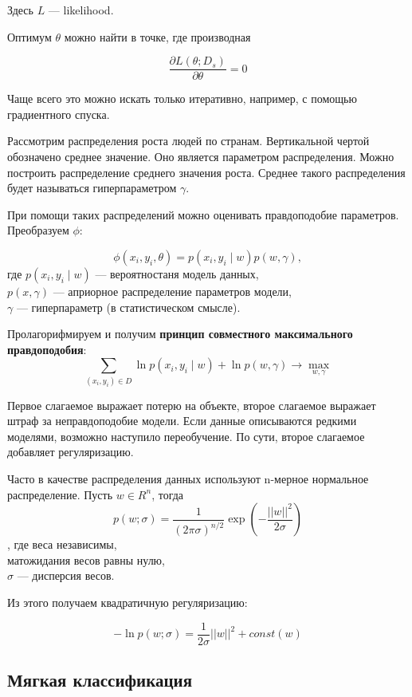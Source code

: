 Здесь $L$ --- likelihood.

Оптимум $\theta$ можно найти в точке, где производная

\[
    \frac{\partial L(\theta; D_s)}{\partial \theta} = 0
\]

Чаще всего это можно искать только итеративно, например, с помощью градиентного
спуска.

Рассмотрим распределения роста людей по странам. Вертикальной чертой
обозначено среднее значение. Оно является параметром распределения. Можно
построить распределение среднего значения роста. Среднее такого распределения
будет называться гиперпараметром $\gamma$.


При помощи таких распределений можно оценивать правдоподобие параметров.
Преобразуем $\phi$:

\[
    \phi(x_i, y_i, \theta) = p(x_i, y_i \mid w) p(w, \gamma),
\] где $p(x_i, y_i \mid w)$ --- вероятностаня модель данных,\\
$p(x, \gamma)$ --- априорное распределение параметров модели,\\
$\gamma$ --- гиперпараметр (в статистическом смысле).

Пролагорифмируем и получим \textbf{принцип совместного максимального правдоподобия}:
\[
    \sum_{(x_i, y_i) \in D} \ln p(x_i, y_i \mid w) + \ln p(w, \gamma) \to
    \max_{w, \gamma}
\]

Первое слагаемое выражает потерю на объекте, второе слагаемое выражает штраф за
неправдоподобие модели. Если данные описываются редкими моделями, возможно
наступило переобучение. По сути, второе слагаемое добавляет регуляризацию.

Часто в качестве распределения данных используют n-мерное нормальное
распределение. Пусть $w \in R^n$, тогда
\[
    p(w; \sigma) = \frac{1}{(2\pi \sigma)^{n/2}} \exp \left( -
    \frac{||w||^2}{2\sigma} \right)
\], где веса независимы,\\
матожидания весов равны нулю,\\
$\sigma$ --- дисперсия весов.

Из этого получаем квадратичную регуляризацию:

\[
    - \ln p(w; \sigma) = \frac{1}{2\sigma} ||w||^2 + const(w)
\]

\subsection{Мягкая классификация}

